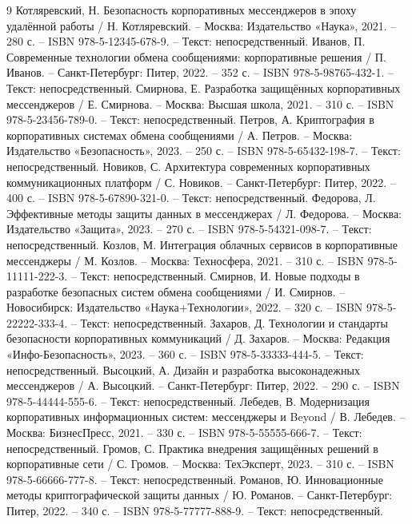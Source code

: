 
\begin{thebibliography}{9}
	Котляревский, Н. 
	Безопасность корпоративных мессенджеров в эпоху удалённой работы / Н. Котляревский. 
	– Москва: Издательство «Наука», 2021. – 280 с. – ISBN 978-5-12345-678-9. – Текст: непосредственный.
	Иванов, П. 
	Современные технологии обмена сообщениями: корпоративные решения / П. Иванов. 
	– Санкт-Петербург: Питер, 2022. – 352 с. – ISBN 978-5-98765-432-1. – Текст: непосредственный.
	Смирнова, Е. 
	Разработка защищённых корпоративных мессенджеров / Е. Смирнова. 
	– Москва: Высшая школа, 2021. – 310 с. – ISBN 978-5-23456-789-0. – Текст: непосредственный.
	Петров, А. 
	Криптография в корпоративных системах обмена сообщениями / А. Петров. 
	– Москва: Издательство «Безопасность», 2023. – 250 с. – ISBN 978-5-65432-198-7. – Текст: непосредственный.
	Новиков, С. 
	Архитектура современных корпоративных коммуникационных платформ / С. Новиков. 
	– Санкт-Петербург: Питер, 2022. – 400 с. – ISBN 978-5-67890-321-0. – Текст: непосредственный.
	Федорова, Л. 
	Эффективные методы защиты данных в мессенджерах / Л. Федорова. 
	– Москва: Издательство «Защита», 2023. – 270 с. – ISBN 978-5-54321-098-7. – Текст: непосредственный.
	Козлов, М. 
	Интеграция облачных сервисов в корпоративные мессенджеры / М. Козлов. 
	– Москва: Техносфера, 2021. – 310 с. – ISBN 978-5-11111-222-3. – Текст: непосредственный.
	Смирнов, И. 
	Новые подходы в разработке безопасных систем обмена сообщениями / И. Смирнов. 
	– Новосибирск: Издательство «Наука+Технологии», 2022. – 320 с. – ISBN 978-5-22222-333-4. – Текст: непосредственный.
	Захаров, Д. 
	Технологии и стандарты безопасности корпоративных коммуникаций / Д. Захаров. 
	– Москва: Редакция «Инфо-Безопасность», 2023. – 360 с. – ISBN 978-5-33333-444-5. – Текст: непосредственный.
	Высоцкий, А. 
	Дизайн и разработка высоконадежных мессенджеров / А. Высоцкий. 
	– Санкт-Петербург: Питер, 2022. – 290 с. – ISBN 978-5-44444-555-6. – Текст: непосредственный.
	Лебедев, В. 
	Модернизация корпоративных информационных систем: мессенджеры и Beyond / В. Лебедев. 
	– Москва: БизнесПресс, 2021. – 330 с. – ISBN 978-5-55555-666-7. – Текст: непосредственный.
	Громов, С. 
	Практика внедрения защищённых решений в корпоративные сети / С. Громов. 
	– Москва: ТехЭксперт, 2023. – 310 с. – ISBN 978-5-66666-777-8. – Текст: непосредственный.
	Романов, Ю. 
	Инновационные методы криптографической защиты данных / Ю. Романов. 
	– Санкт-Петербург: Питер, 2022. – 340 с. – ISBN 978-5-77777-888-9. – Текст: непосредственный.
	
\end{thebibliography}